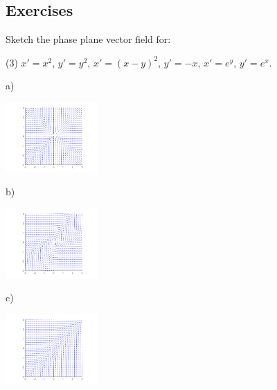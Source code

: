 \subsection{Exercises}

\begin{exercise}
Sketch the phase plane vector field for:
\begin{tasks}(3)
\task $x'=x^2$, \enspace $y'=y^2$,
\task $x'=(x-y)^2$, \enspace $y'=-x$,
\task $x'=e^y$, \enspace $y'=e^x$.
\end{tasks}
\end{exercise}
\comboSol{%
}
{%
a)~\parbox[c]{1.4in}{\includegraphics[width=1.4in]{Images/sysslopex2y2.png}} \quad b)~\parbox[c]{1.4in}{\includegraphics[width=1.4in]{Images/sysslopexmy2mx.png}} \quad c)~\parbox[c]{1.4in}{\includegraphics[width=1.4in]{Images/sysslopeeyex.png}}
}

